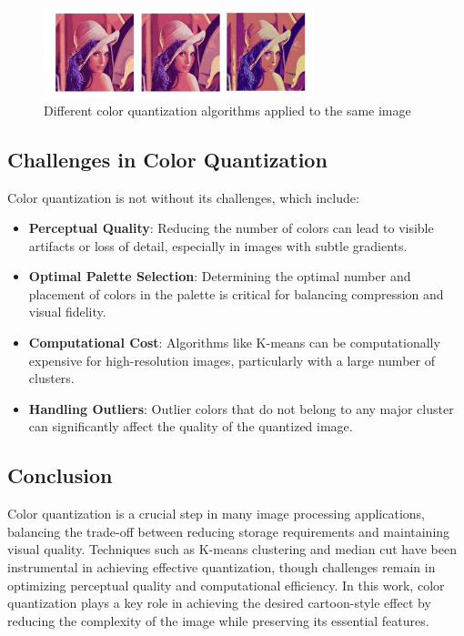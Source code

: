 \begin{figure}[H]
    \centering
    \includegraphics[width=0.7\textwidth]{images/color_quantization.png}
    \caption{Different color quantization algorithms applied to the same image}
    \label{fig:color_quantization}
\end{figure}

\subsection{Challenges in Color Quantization}

Color quantization is not without its challenges, which include:

\begin{itemize}
    \item \textbf{Perceptual Quality}: Reducing the number of colors can lead to visible artifacts or loss of detail, especially in images with subtle gradients.
    \item \textbf{Optimal Palette Selection}: Determining the optimal number and placement of colors in the palette is critical for balancing compression and visual fidelity.
    \item \textbf{Computational Cost}: Algorithms like K-means can be computationally expensive for high-resolution images, particularly with a large number of clusters.
    \item \textbf{Handling Outliers}: Outlier colors that do not belong to any major cluster can significantly affect the quality of the quantized image.
\end{itemize}


\subsection{Conclusion}

Color quantization is a crucial step in many image processing applications, balancing the trade-off between reducing storage requirements and maintaining visual quality. Techniques such as K-means clustering and median cut have been instrumental in achieving effective quantization, though challenges remain in optimizing perceptual quality and computational efficiency. In this work, color quantization plays a key role in achieving the desired cartoon-style effect by reducing the complexity of the image while preserving its essential features.

